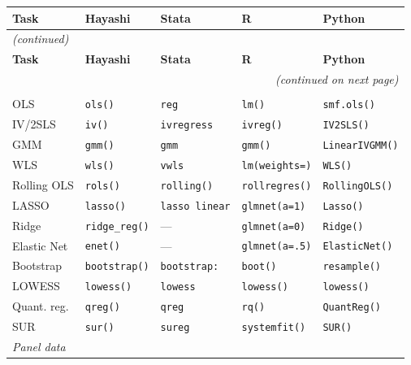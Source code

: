 {\footnotesize\setlength{\tabcolsep}{3pt}%
\begin{longtable}{lllll}
\toprule
\textbf{Task} & \textbf{Hayashi} & \textbf{Stata} & \textbf{R} & \textbf{Python} \\
\midrule
\endfirsthead
\multicolumn{5}{l}{\footnotesize\itshape (continued)} \\[2pt]
\toprule
\textbf{Task} & \textbf{Hayashi} & \textbf{Stata} & \textbf{R} & \textbf{Python} \\
\midrule
\endhead
\midrule
\multicolumn{5}{r}{\footnotesize\itshape (continued on next page)} \\
\endfoot
\bottomrule
\endlastfoot
%
\multicolumn{5}{l}{\textit{Regression}} \\
OLS             & \texttt{ols()}        & \texttt{reg}          & \texttt{lm()}          & \texttt{smf.ols()} \\
IV/2SLS         & \texttt{iv()}         & \texttt{ivregress}    & \texttt{ivreg()}       & \texttt{IV2SLS()} \\
GMM             & \texttt{gmm()}        & \texttt{gmm}          & \texttt{gmm()}         & \texttt{LinearIVGMM()} \\
WLS             & \texttt{wls()}        & \texttt{vwls}         & \texttt{lm(weights=)}  & \texttt{WLS()} \\
Rolling OLS     & \texttt{rols()}       & \texttt{rolling()}    & \texttt{rollregres()}  & \texttt{RollingOLS()} \\
LASSO           & \texttt{lasso()}      & \texttt{lasso linear} & \texttt{glmnet(a=1)}   & \texttt{Lasso()} \\
Ridge           & \texttt{ridge\_reg()} & —                     & \texttt{glmnet(a=0)}   & \texttt{Ridge()} \\
Elastic Net     & \texttt{enet()}       & —                     & \texttt{glmnet(a=.5)}  & \texttt{ElasticNet()} \\
Bootstrap       & \texttt{bootstrap()}  & \texttt{bootstrap:}   & \texttt{boot()}        & \texttt{resample()} \\
LOWESS          & \texttt{lowess()}     & \texttt{lowess}       & \texttt{lowess()}      & \texttt{lowess()} \\
Quant. reg.     & \texttt{qreg()}       & \texttt{qreg}         & \texttt{rq()}          & \texttt{QuantReg()} \\
SUR             & \texttt{sur()}        & \texttt{sureg}        & \texttt{systemfit()}   & \texttt{SUR()} \\
\midrule
\multicolumn{5}{l}{\textit{Panel data}} \\

\end{longtable}}
